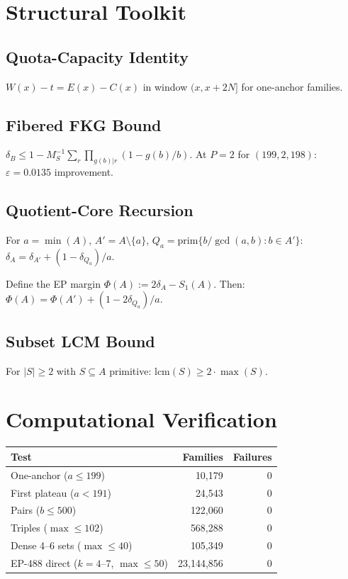 \documentclass[11pt,a4paper]{article}
\theoremstyle{definition}
\begin{document}
\section{Structural Toolkit}

\subsection{Quota-Capacity Identity}
$W(x) - t = E(x) - C(x)$ in window $(x, x{+}2N]$ for one-anchor families.

\subsection{Fibered FKG Bound}
$\delta_B \leq 1 - M_S^{-1}\sum_r \prod_{g(b)|r}(1 - g(b)/b)$.
At $P{=}2$ for $(199,2,198)$: $\varepsilon = 0.0135$ improvement.

\subsection{Quotient-Core Recursion}
For $a = \min(A)$, $A' = A \setminus \{a\}$,
$Q_a = \mathrm{prim}\{b/\gcd(a,b) : b \in A'\}$:
$\delta_A = \delta_{A'} + (1 - \delta_{Q_a})/a$.

Define the EP margin $\Phi(A) := 2\delta_A - S_1(A)$. Then:
$\Phi(A) = \Phi(A') + (1 - 2\delta_{Q_a})/a$.

\subsection{Subset LCM Bound}
For $|S| \geq 2$ with $S \subseteq A$ primitive:
$\mathrm{lcm}(S) \geq 2 \cdot \max(S)$.

\section{Computational Verification}

\begin{center}
\begin{tabular}{lrr}
\toprule
\textbf{Test} & \textbf{Families} & \textbf{Failures} \\
\midrule
One-anchor ($a \leq 199$) & 10,179 & 0 \\
First plateau ($a < 191$) & 24,543 & 0 \\
Pairs ($b \leq 500$) & 122,060 & 0 \\
Triples ($\max \leq 102$) & 568,288 & 0 \\
Dense 4--6 sets ($\max \leq 40$) & 105,349 & 0 \\
EP-488 direct ($k = 4$--$7$, $\max \leq 50$) & 23,144,856 & 0 \\
\bottomrule
\end{tabular}
\end{center}
\end{document}

